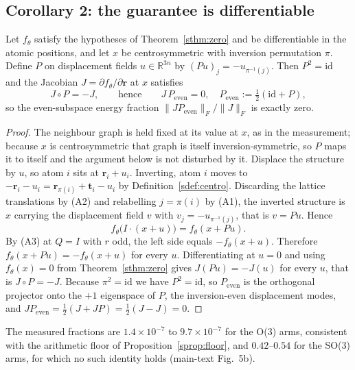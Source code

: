 \subsection*{Corollary 2: the guarantee is differentiable}

\begin{corollary}\label{scor:jac}
Let $f_\theta$ satisfy the hypotheses of Theorem~\ref{sthm:zero} and be differentiable in the atomic positions, and let $x$ be centrosymmetric with inversion permutation $\pi$. Define $P$ on displacement fields $u \in \mathbb{R}^{3n}$ by $(Pu)_{j} = -u_{\pi^{-1}(j)}$. Then $P^{2} = \mathrm{id}$ and the Jacobian $J = \partial f_\theta/\partial\mathbf{r}$ at $x$ satisfies
\[
J \circ P = -J, \qquad\text{hence}\qquad J\,P_{\mathrm{even}} = 0, \quad P_{\mathrm{even}} := \tfrac{1}{2}(\mathrm{id} + P),
\]
so the even-subspace energy fraction $\lVert J P_{\mathrm{even}}\rVert_F / \lVert J \rVert_F$ is exactly zero.
\end{corollary}

\begin{proof}
The neighbour graph is held fixed at its value at $x$, as in the measurement; because $x$ is centrosymmetric that graph is itself inversion-symmetric, so $P$ maps it to itself and the argument below is not disturbed by it. Displace the structure by $u$, so atom $i$ sits at $\mathbf{r}_i + u_i$. Inverting, atom $i$ moves to $-\mathbf{r}_i - u_i = \mathbf{r}_{\pi(i)} + \mathbf{t}_i - u_i$ by Definition~\ref{sdef:centro}. Discarding the lattice translations by (A2) and relabelling $j = \pi(i)$ by (A1), the inverted structure is $x$ carrying the displacement field $v$ with $v_j = -u_{\pi^{-1}(j)}$, that is $v = Pu$. Hence
\[
f_\theta\bigl(I\!\cdot\!(x+u)\bigr) = f_\theta(x + Pu).
\]
By (A3) at $Q=I$ with $r$ odd, the left side equals $-f_\theta(x+u)$. Therefore $f_\theta(x+Pu) = -f_\theta(x+u)$ for every $u$. Differentiating at $u=0$ and using $f_\theta(x)=0$ from Theorem~\ref{sthm:zero} gives $J(Pu) = -J(u)$ for every $u$, that is $J\circ P = -J$.
Because $\pi^{2}=\mathrm{id}$ we have $P^{2}=\mathrm{id}$, so $P_{\mathrm{even}}$ is the orthogonal projector onto the $+1$ eigenspace of $P$, the inversion-even displacement modes, and
$J P_{\mathrm{even}} = \tfrac{1}{2}(J + J P) = \tfrac{1}{2}(J - J) = 0$.
\end{proof}

The measured fractions are $1.4\times10^{-7}$ to $9.7\times10^{-7}$ for the O(3) arms, consistent with the arithmetic floor of Proposition~\ref{sprop:floor}, and $0.42$--$0.54$ for the SO(3) arms, for which no such identity holds (main-text Fig.~5b).

